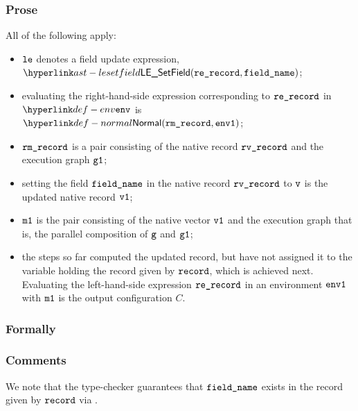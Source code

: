 \subsubsection{Prose}
All of the following apply:
\begin{itemize}
  \item $\vle$ denotes a field update expression, $\LESetField(\rerecord, \fieldname)$;
  \item evaluating the right-hand-side expression corresponding to $\rerecord$
  in $\env$ is $\Normal(\rmrecord, \envone)$\ProseOrAbnormal;
  \item $\rmrecord$ is a pair consisting of the native record $\rvrecord$ and
  the execution graph $\vgone$;
  \item setting the field $\fieldname$ in the native record $\rvrecord$ to $\vv$
  is the updated native record $\vvone$;
  \item $\vmone$ is the pair consisting of the native vector $\vvone$ and the
  execution graph that is, the parallel composition of $\vg$ and $\vgone$;
  \item the steps so far computed the updated record, but have not assigned it to
  the variable holding the record given by $\record$, which is achieved next.
  Evaluating the left-hand-side expression $\rerecord$ in an environment $\envone$ with $\vmone$
  is the output configuration $C$.
\end{itemize}

\subsubsection{Formally}
\begin{mathpar}
\end{mathpar}

\subsubsection{Comments}
We note that the type-checker guarantees that $\fieldname$ exists in the record given by $\record$
via .

